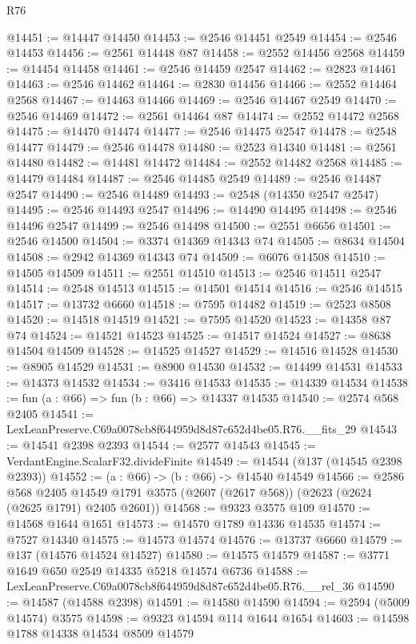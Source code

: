 \begin{lexlean}{R76}
\begin{coremodule}
@14451 := @14447 @14450
@14453 := @2546 @14451 @2549
@14454 := @2546 @14453
@14456 := @2561 @14448 @87
@14458 := @2552 @14456 @2568
@14459 := @14454 @14458
@14461 := @2546 @14459 @2547
@14462 := @2823 @14461
@14463 := @2546 @14462
@14464 := @2830 @14456
@14466 := @2552 @14464 @2568
@14467 := @14463 @14466
@14469 := @2546 @14467 @2549
@14470 := @2546 @14469
@14472 := @2561 @14464 @87
@14474 := @2552 @14472 @2568
@14475 := @14470 @14474
@14477 := @2546 @14475 @2547
@14478 := @2548 @14477
@14479 := @2546 @14478
@14480 := @2523 @14340
@14481 := @2561 @14480
@14482 := @14481 @14472
@14484 := @2552 @14482 @2568
@14485 := @14479 @14484
@14487 := @2546 @14485 @2549
@14489 := @2546 @14487 @2547
@14490 := @2546 @14489
@14493 := @2548 (@14350 @2547 @2547)
@14495 := @2546 @14493 @2547
@14496 := @14490 @14495
@14498 := @2546 @14496 @2547
@14499 := @2546 @14498
@14500 := @2551 @6656
@14501 := @2546 @14500
@14504 := @3374 @14369 @14343 @74
@14505 := @8634 @14504
@14508 := @2942 @14369 @14343 @74
@14509 := @6076 @14508
@14510 := @14505 @14509
@14511 := @2551 @14510
@14513 := @2546 @14511 @2547
@14514 := @2548 @14513
@14515 := @14501 @14514
@14516 := @2546 @14515
@14517 := @13732 @6660
@14518 := @7595 @14482
@14519 := @2523 @8508
@14520 := @14518 @14519
@14521 := @7595 @14520
@14523 := @14358 @87 @74
@14524 := @14521 @14523
@14525 := @14517 @14524
@14527 := @8638 @14504 @14509
@14528 := @14525 @14527
@14529 := @14516 @14528
@14530 := @8905 @14529
@14531 := @8900 @14530
@14532 := @14499 @14531
@14533 := @14373 @14532
@14534 := @3416 @14533
@14535 := @14339 @14534
@14538 := fun (a : @66) => fun (b : @66) => @14337 @14535
@14540 := @2574 @568 @2405
@14541 := LexLeanPreserve.C69a0078cb8f644959d8d87c652d4be05.R76.__fits_29
@14543 := @14541 @2398 @2393
@14544 := @2577 @14543
@14545 := VerdantEngine.ScalarF32.divideFinite
@14549 := @14544 (@137 (@14545 @2398 @2393))
@14552 := (a : @66) -> (b : @66) -> @14540 @14549
@14566 := @2586
    @568
    @2405
    @14549
    @1791
    @3575
    (@2607 (@2617 @568))
    (@2623 (@2624 (@2625 @1791) @2405 @2601))
@14568 := @9323 @3575 @109
@14570 := @14568 @1644 @1651
@14573 := @14570 @1789 @14336 @14535
@14574 := @7527 @14340
@14575 := @14573 @14574
@14576 := @13737 @6660
@14579 := @137 (@14576 @14524 @14527)
@14580 := @14575 @14579
@14587 := @3771 @1649 @650 @2549 @14335 @5218 @14574 @6736
@14588 := LexLeanPreserve.C69a0078cb8f644959d8d87c652d4be05.R76.__rel_36
@14590 := @14587 (@14588 @2398)
@14591 := @14580 @14590
@14594 := @2594 (@5009 @14574) @3575
@14598 := @9323 @14594 @114 @1644 @1654
@14603 := @14598 @1788 @14338 @14534 @8509 @14579

\end{coremodule}
\end{lexlean}
